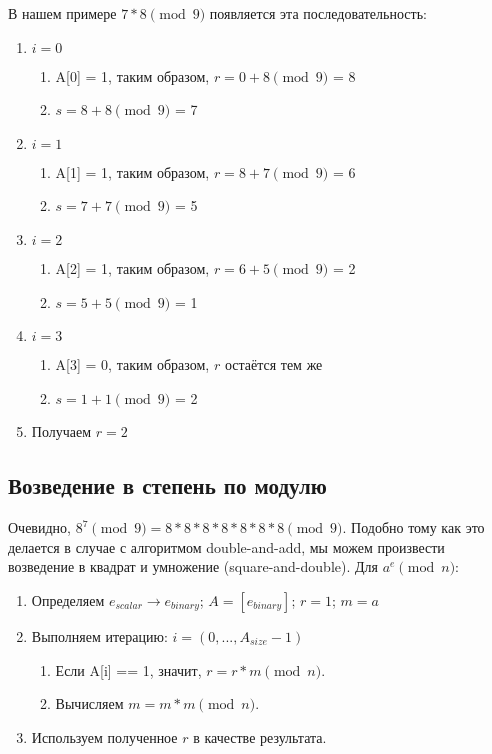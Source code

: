 В нашем примере $7*8 \pmod 9$ появляется эта последовательность:
\begin{enumerate}
	\item $i = 0$
	\begin{enumerate}
		\item A[0] = 1, таким образом, $r = 0 + 8 \pmod 9$ = 8
		\item $s = 8 + 8 \pmod 9$ = 7
	\end{enumerate}
	\item $i = 1$
	\begin{enumerate}
		\item A[1] = 1, таким образом, $r = 8 + 7 \pmod 9$ = 6
		\item $s = 7 + 7 \pmod 9$ = 5
	\end{enumerate}
	\item $i = 2$
	\begin{enumerate}
		\item A[2] = 1, таким образом, $r = 6 + 5 \pmod 9$ = 2
		\item $s = 5 + 5 \pmod 9$ = 1
	\end{enumerate}
	\item $i = 3$
	\begin{enumerate}
		\item A[3] = 0, таким образом, $r$ остаётся тем же
		\item $s = 1 + 1 \pmod 9$ = 2
	\end{enumerate}
	\item Получаем $r = 2$
\end{enumerate}


\subsection{Возведение в степень по модулю}

Очевидно, $8^7 \pmod 9 = 8*8*8*8*8*8*8 \pmod 9$. Подобно тому как это делается в случае с алгоритмом double-and-add, мы можем произвести возведение в квадрат и умножение (square-and-double). Для $a^e \pmod{n}$:
\begin{enumerate}
	\item Определяем $e_{scalar} \rightarrow e_{binary}$; $A = [e_{binary}]$; $r = 1$; $m = a$
	\item Выполняем итерацию: $i = (0,...,A_{size} - 1)$
	\begin{enumerate}
		\item Если A[i] == 1, значит, $r = r * m \pmod n$.
		\item Вычисляем $m = m * m \pmod n$.
	\end{enumerate}
	\item Используем полученное $r$ в качестве результата.
\end{enumerate}


